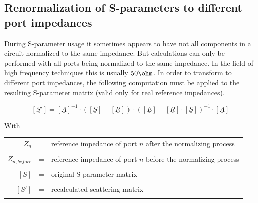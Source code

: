 \subsection{Renormalization of S-parameters to different port impedances}

During S-parameter usage it sometimes appears to have not all components
in a circuit normalized to the same impedance. But calculations can only
be performed with all ports being normalized to the same impedance. In
the field of high frequency techniques this is usually $50\ohm$. In order
to transform to different port impedances, the following computation must
be applied to the resulting S-parameter matrix (valid only for real reference impedances).

\begin{equation}
\left[\underline{S'}\right] = \left[\underline{A}\right]^{-1} \cdot
\left(\left[\underline{S}\right] - \left[\underline{R}\right]\right) \cdot
\left(\left[\underline{E}\right] - \left[\underline{R}\right] \cdot \left[\underline{S}\right]\right)^{-1}
\cdot \left[\underline{A}\right]
\end{equation}

With

\addvspace{12pt}

\begin{tabular}{rll}
$Z_{n}$ & = & reference impedance of port $n$ after the normalizing process\\& &\\
$Z_{n,before}$ & = & reference impedance of port $n$ before the normalizing process\\& &\\
$\left[\underline{S}\right]$ & = & original S-parameter matrix\\& &\\
$\left[\underline{S'}\right]$ & = & recalculated scattering matrix\\& &\\
\end{tabular}

